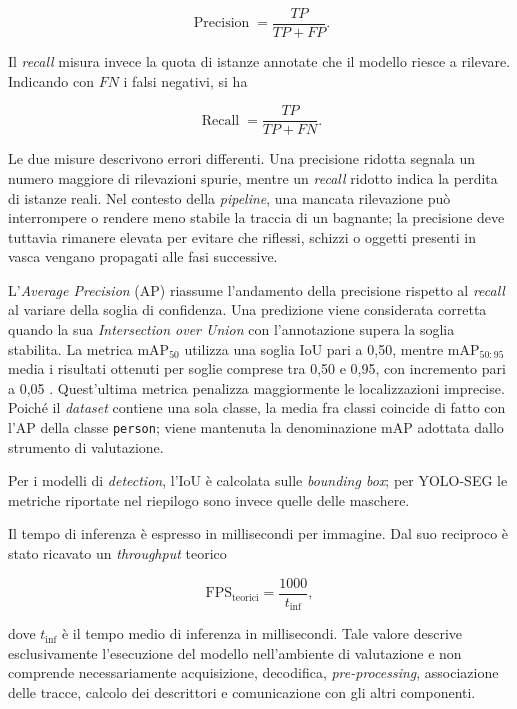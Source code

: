 \begin{equation}
    \operatorname{Precision}
    =
    \frac{TP}{TP+FP}.
\end{equation}

Il \textit{recall} misura invece la quota di istanze annotate che il modello riesce a rilevare. Indicando con $FN$ i falsi negativi, si ha

\begin{equation}
    \operatorname{Recall}
    =
    \frac{TP}{TP+FN}.
\end{equation}

Le due misure descrivono errori differenti. Una precisione ridotta segnala un numero maggiore di rilevazioni spurie, mentre un \textit{recall} ridotto indica la perdita di istanze reali. Nel contesto della \textit{pipeline}, una mancata rilevazione può interrompere o rendere meno stabile la traccia di un bagnante; la precisione deve tuttavia rimanere elevata per evitare che riflessi, schizzi o oggetti presenti in vasca vengano propagati alle fasi successive.

L'\textit{Average Precision} (AP) riassume l'andamento della precisione rispetto al \textit{recall} al variare della soglia di confidenza. Una predizione viene considerata corretta quando la sua \textit{Intersection over Union} con l'annotazione supera la soglia stabilita. La metrica $\mathrm{mAP}_{50}$ utilizza una soglia IoU pari a 0{,}50, mentre $\mathrm{mAP}_{50:95}$ media i risultati ottenuti per soglie comprese tra 0{,}50 e 0{,}95, con incremento pari a 0{,}05 \cite{Lin2014COCO}. Quest'ultima metrica penalizza maggiormente le localizzazioni imprecise. Poiché il \textit{dataset} contiene una sola classe, la media fra classi coincide di fatto con l'AP della classe \texttt{person}; viene mantenuta la denominazione mAP adottata dallo strumento di valutazione.

Per i modelli di \textit{detection}, l'IoU è calcolata sulle \textit{bounding box}; per YOLO-SEG le metriche riportate nel riepilogo sono invece quelle delle maschere.

Il tempo di inferenza è espresso in millisecondi per immagine. Dal suo reciproco è stato ricavato un \textit{throughput} teorico

\begin{equation}
    \mathrm{FPS}_{\mathrm{teorici}}
    =
    \frac{1000}{t_{\mathrm{inf}}},
\end{equation}

dove $t_{\mathrm{inf}}$ è il tempo medio di inferenza in millisecondi. Tale valore descrive esclusivamente l'esecuzione del modello nell'ambiente di valutazione e non comprende necessariamente acquisizione, decodifica, \textit{pre-processing}, associazione delle tracce, calcolo dei descrittori e comunicazione con gli altri componenti.

